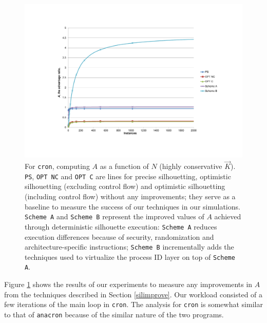 \begin{figure}[h]
  \center
  \includegraphics[scale=0.80, trim=5cm 3cm 0cm 3cm]{cron-1.pdf}
  \caption[For \texttt{cron}, $A$ as a function of $N$ (highly conservative $\vec K$)]%
          {
            For \texttt{cron}, computing $A$ as a function of $N$ (highly conservative $\vec K$).\newline
            \texttt{PS}, \texttt{OPT NC} and \texttt{OPT C} are lines for precise silhouetting, optimistic 
            silhouetting (excluding control flow) and optimistic silhouetting
            (including control flow) without any improvements; they
            serve as a baseline to measure the success of our techniques
            in our simulations. \texttt{Scheme A} and \texttt{Scheme B} represent the improved values of $A$
            achieved through deterministic silhouette execution:
            \texttt{Scheme A} reduces execution differences because
            of security, randomization and architecture-specific instructions;
            \texttt{Scheme B} incrementally adds the techniques used to
            virtualize the process ID layer on top of \texttt{Scheme A}.            
          }
  \label{cron1}
\end{figure}

\newpage
\noindent Figure \ref {cron1} shows the results of our experiments
to measure any improvements in $A$ from the techniques described in Section \ref{silimprove}.
Our workload consisted of a few iterations of the main loop in \texttt{cron}.
The analysis for \texttt{cron} is somewhat similar to that of 
\texttt{anacron} because of the similar nature of the two programs.

